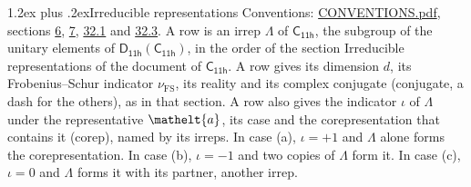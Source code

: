 \documentclass[10pt,a4paper]{article}
\makeatletter
\renewcommand\section{\@startsection{section}{1}{\z@}{-3ex plus -1ex minus -.2ex}%
  {1.2ex plus .2ex}{\normalfont\large\sffamily\bfseries\color{parttitle}}}
\numberwithin{equation}{section}
\newcommand{\eltfont}[1]{{\let\sigma\eltsigma\mathelt{#1}}}
\newcommand{\grp}[1]{\mathsf{#1}}
\newcommand{\elt}[1]{\eltfont{#1}}
\newcommand{\fsind}{\nu_{\mathrm{FS}}}
\makeatother
\begin{document}
\section{Irreducible representations}\label{s:irreps}
Conventions: \href{../../CONVENTIONS.pdf}{CONVENTIONS.pdf}, sections \href{../../../rotation/CONVENTIONS.pdf\#conv.6}{6}, \href{../../../rotation/CONVENTIONS.pdf\#conv.7}{7}, \href{../../CONVENTIONS.pdf\#conv.32.1}{32.1} and \href{../../CONVENTIONS.pdf\#conv.32.3}{32.3}.
\leavevmode\label{n:irrep.Delta}A row is an irrep $\Lambda$ of $\grp{C_{11h}}$, the subgroup of the unitary elements of $\grp{D_{11h}}(\grp{C_{11h}})$, in the order of the section Irreducible representations of the document of \href{../../../rotation/data/pdf/C11h.pdf}{$\grp{C_{11h}}$}. \label{n:index.dimension}\label{n:index.frobenius}\label{n:head.irrep}\label{n:head.reality}\label{n:head.conjugate}A row gives its dimension $d$, its Frobenius--Schur indicator $\fsind$, its reality and its complex conjugate (conjugate, a dash for the others), as in that section. \label{n:head.case.corep}\label{n:head.corep}A row also gives the indicator $\iota$ of $\Lambda$ under the representative $\elt{a}$, its case and the corepresentation that contains it (corep), named by its irreps. In case (a), $\iota = +1$ and $\Lambda$ alone forms the corepresentation. In case (b), $\iota = -1$ and two copies of $\Lambda$ form it. In case (c), $\iota = 0$ and $\Lambda$ forms it with its partner, another irrep.
\setlength{\emergencystretch}{2em}\par\setlength{\emergencystretch}{0pt}
\end{document}
